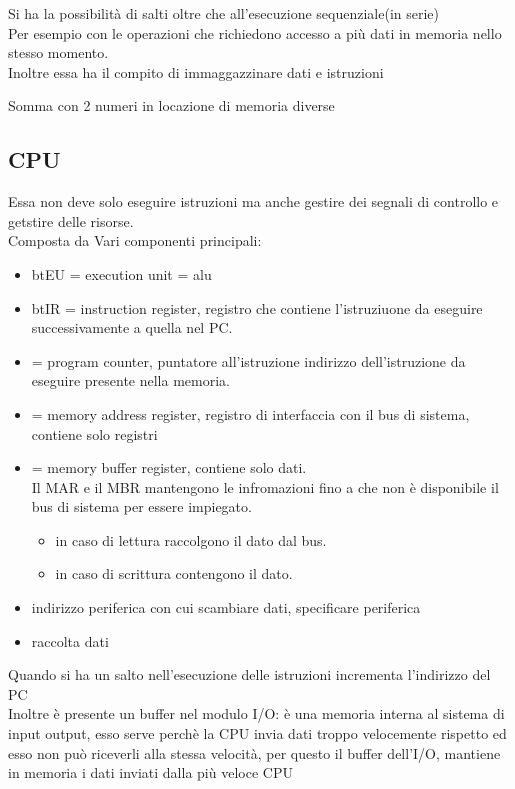 \documentclass[12pt, a4paper]{article}
\begin{document}
\begin{defn}
Si ha la possibilità di salti oltre che all'esecuzione sequenziale(in serie)\\
Per esempio con le operazioni che richiedono accesso a più dati in memoria
nello stesso momento.\\
Inoltre essa ha il compito di immaggazzinare dati e istruzioni
\end{defn}

\begin{esem}
Somma con 2 numeri in locazione di memoria diverse
\end{esem}

\subsection{CPU}
Essa non deve solo eseguire istruzioni ma anche gestire dei segnali di controllo e 
getstire delle risorse.\\
Composta da Vari componenti principali:

\begin{itemize}
\item bt{EU} = execution unit = alu

\item bt{IR} = instruction register, registro che 
	contiene l'istruziuone da eseguire successivamente a quella nel PC.
\item {} = program counter, puntatore all'istruzione 
	indirizzo dell'istruzione da eseguire presente nella memoria.
\item {} = memory address register, registro di interfaccia con 
	il bus di sistema, contiene solo registri
\item {} = memory buffer register, contiene solo dati.\\
Il MAR e il MBR mantengono le infromazioni fino a che non è 
disponibile il bus di sistema per essere impiegato.

	\begin{itemize}
		\item in caso di lettura raccolgono il dato dal bus.
		\item in caso di scrittura contengono il dato.
	\end{itemize}
\item {} indirizzo periferica con cui scambiare dati, 
	specificare periferica 
\item {} raccolta dati 
\end{itemize}
Quando si ha un salto nell'esecuzione delle 
istruzioni incrementa l'indirizzo del PC\\
Inoltre è presente un buffer nel modulo I/O: è una memoria interna al sistema di 
input output, esso serve perchè la CPU invia dati troppo velocemente rispetto 
ed esso non può riceverli alla stessa velocità, per questo 
il buffer dell'I/O, mantiene in memoria i dati inviati dalla più veloce CPU 
\end{document}

